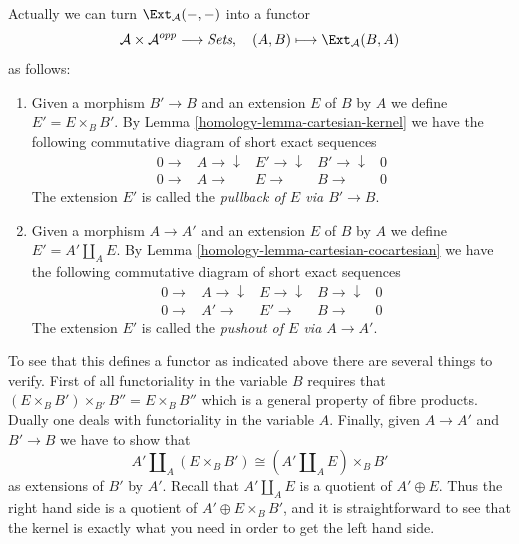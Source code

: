 \medskip\noindent
Actually we can turn $\Ext_\mathcal{A}(-, -)$ into a
functor
$$
\mathcal{A} \times \mathcal{A}^{opp} \longrightarrow \textit{Sets}, \quad
(A, B) \longmapsto \Ext_\mathcal{A}(B, A)
$$
as follows:
\begin{enumerate}
\item Given a morphism $B' \to B$ and an extension
$E$ of $B$ by $A$ we define $E' = E \times_B B'$.
By Lemma \ref{homology-lemma-cartesian-kernel} we have the following
commutative diagram of short exact sequences
$$
\begin{array}{ccccc}0 \longrightarrow & A \longrightarrow\downarrow & E' \longrightarrow\downarrow & B' \longrightarrow\downarrow & 0 \\ 0 \longrightarrow & A \longrightarrow & E \longrightarrow & B \longrightarrow & 0\end{array}
$$
The extension $E'$ is called the {\it pullback of $E$ via
$B' \to B$}.
\item Given a morphism $A \to A'$ and an extension
$E$ of $B$ by $A$ we define $E' = A' \amalg_A E$.
By Lemma \ref{homology-lemma-cartesian-cocartesian}
we have the following commutative diagram
of short exact sequences
$$
\begin{array}{ccccc}0 \longrightarrow & A \longrightarrow\downarrow & E \longrightarrow\downarrow & B \longrightarrow\downarrow & 0 \\ 0 \longrightarrow & A' \longrightarrow & E' \longrightarrow & B \longrightarrow & 0\end{array}
$$
The extension $E'$ is called the {\it pushout of $E$ via
$A \to A'$}.
\end{enumerate}
To see that this defines a functor as indicated above
there are several things to verify. First of all
functoriality in the variable $B$ requires that
$(E \times_B B') \times_{B'} B'' = E \times_B B''$
which is a general property of fibre products.
Dually one deals with functoriality in the
variable $A$. Finally, given $A \to A'$ and
$B' \to B$ we have to show that
$$
A' \amalg_A (E \times_B B')
\cong
(A' \amalg_A E)\times_B B'
$$
as extensions of $B'$ by $A'$. Recall that $A' \amalg_A E$
is a quotient of $A' \oplus E$.
Thus the right hand side is a quotient of
$A' \oplus E \times_B B'$, and it is straightforward to see that
the kernel is exactly what you need in order to
get the left hand side.

